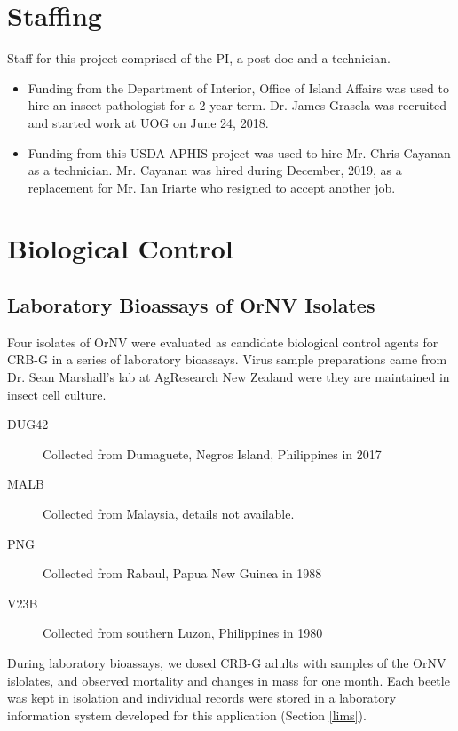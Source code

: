 \documentclass[12pt,
letterpaper,english,bibliography=totocnumbered, abstract=on]{scrartcl}
\begin{document}
\section{Staffing}

Staff for this project comprised of the PI, a post-doc and a technician. 

\begin{itemize}
	
\item Funding from the Department of Interior, Office of Island Affairs
was used to hire an insect pathologist for a 2 year term. Dr. James
Grasela was recruited and started work at UOG on June 24, 2018.

\item Funding from this USDA-APHIS project was used to hire Mr. Chris Cayanan as a technician. Mr. Cayanan was hired during December, 2019, as a replacement for Mr. Ian Iriarte who resigned to accept another job.

\end{itemize}

\section{Biological Control}

\subsection{Laboratory Bioassays of OrNV Isolates}

Four isolates of OrNV were evaluated as candidate biological control agents for CRB-G in a series of laboratory bioassays. Virus sample preparations came from Dr. Sean Marshall's lab at AgResearch New Zealand were they are maintained in insect cell culture.

\begin{description}
	\item[DUG42] Collected from Dumaguete, Negros Island, Philippines in 2017
	\item[MALB] Collected from Malaysia, details not available.
	\item[PNG] Collected from Rabaul, Papua New Guinea in 1988
	\item[V23B] Collected from southern Luzon, Philippines in 1980
\end{description}

During laboratory bioassays, we dosed CRB-G adults with samples of the OrNV islolates, and observed mortality and changes in mass for one month. Each beetle was kept in isolation and individual records were stored in a laboratory information system developed for this application (Section \ref{lims}).
\end{document}
